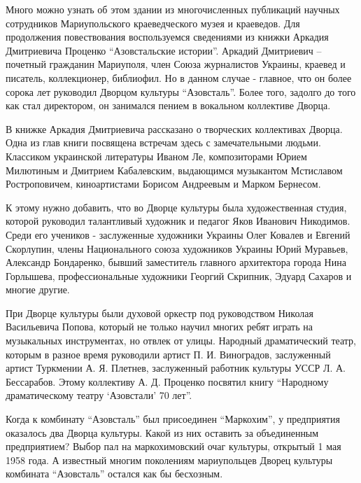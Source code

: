 Много можно узнать об этом здании из многочисленных публикаций научных
сотрудников Мариупольского краеведческого музея и краеведов. Для продолжения
повествования воспользуемся сведениями из книжки Аркадия Дмитриевича Проценко
\enquote{Азовстальские истории}. Аркадий Дмитриевич – почетный гражданин Мариуполя,
член Союза журналистов Украины, краевед и писатель, коллекционер, библиофил. Но
в данном случае - главное, что он более сорока лет руководил Дворцом культуры
\enquote{Азовсталь}. Более того, задолго до того как стал директором, он занимался
пением в вокальном коллективе Дворца.


В книжке Аркадия Дмитриевича рассказано о творческих коллективах Дворца. Одна
из глав книги посвящена встречам здесь с замечательными людьми. Классиком
украинской литературы Иваном Ле, композиторами Юрием Милютиным и Дмитрием
Кабалевским, выдающимся музыкантом Мстиславом Ростроповичем, киноартистами
Борисом Андреевым и Марком Бернесом.

К этому нужно добавить, что во Дворце культуры была художественная студия,
которой руководил талантливый художник и педагог Яков Иванович Никодимов. Среди
его учеников - заслуженные художники Украины Олег Ковалев и Евгений Скорлупин,
члены Национального союза художников Украины Юрий Муравьев, Александр
Бондаренко, бывший заместитель главного архитектора города Нина Горлышева,
профессиональные художники Георгий Скрипник, Эдуард Сахаров и многие другие.

При Дворце культуры были духовой оркестр под руководством Николая Васильевича
Попова, который не только научил многих ребят играть на музыкальных
инструментах, но отвлек от улицы. Народный драматический театр, которым в
разное время руководили артист П. И. Виноградов, заслуженный артист Туркмении
А. Я. Плетнев, заслуженный работник культуры УССР Л. А. Бессарабов. Этому
коллективу А. Д. Проценко посвятил книгу \enquote{Народному драматическому театру
\enquote{Азовстали} 70 лет}.


Когда к комбинату \enquote{Азовсталь} был присоединен \enquote{Маркохим}, у
предприятия оказалось два Дворца культуры. Какой из них оставить за
объединенным предприятием? Выбор пал на маркохимовский очаг культуры, открытый
1 мая 1958 года. А известный многим поколениям мариупольцев Дворец культуры
комбината \enquote{Азовсталь} остался как бы бесхозным.

